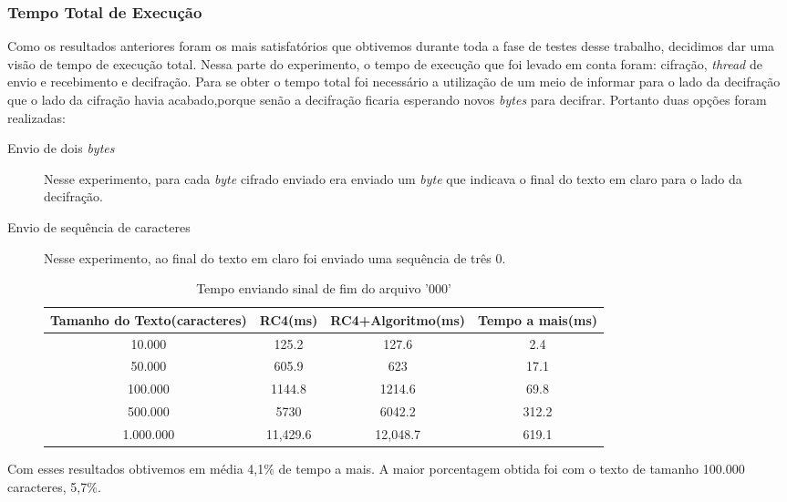 \subsubsection{Tempo Total de Execução}

Como os resultados anteriores foram os mais satisfatórios que obtivemos durante toda a fase de testes desse trabalho, decidimos dar uma visão de tempo de execução total. Nessa parte do experimento, o tempo de execução que foi levado em conta foram: cifração, \textit{thread} de envio e recebimento e decifração. Para se obter o tempo total foi necessário a utilização de um meio de informar para o lado da decifração que o lado da cifração havia acabado,porque senão a decifração ficaria esperando novos \textit{bytes} para decifrar. Portanto duas opções foram realizadas:

\begin{description}
	\item [Envio de dois \textit{bytes}] Nesse experimento, para cada \textit{byte} cifrado enviado era enviado um \textit{byte} que indicava o final do texto em claro para o lado da decifração.
	
	\item[Envio de sequência de caracteres] Nesse experimento, ao final do texto em claro foi enviado uma sequência de três 0.
	
\begin{table}[h]
\centering
\begin{tabular}{|c|c|c|c|}
\hline
Tamanho do Texto(caracteres) & RC4(ms)  & RC4+Algoritmo(ms) & Tempo a mais(ms) \\ \hline
10.000                       & 125.2    & 127.6             & 2.4              \\ \hline
50.000                       & 605.9    & 623               & 17.1             \\ \hline
100.000                      & 1144.8   & 1214.6            & 69.8             \\ \hline
500.000                      & 5730     & 6042.2            & 312.2            \\ \hline
1.000.000                    & 11,429.6 & 12,048.7          & 619.1            \\ \hline
\end{tabular}
\caption{Tempo enviando sinal de fim do arquivo '000'}
\end{table}
\end{description}

Com esses resultados obtivemos em média 4,1\% de tempo a mais. A maior porcentagem obtida foi com o texto de tamanho 100.000 caracteres, 5,7\%.

